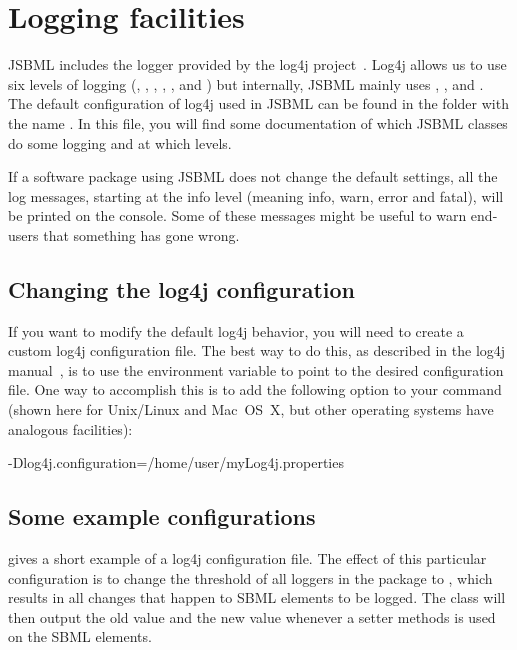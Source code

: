 \section{Logging facilities}
%

JSBML includes the logger provided by the log4j
project~\citep{log4j}.  Log4j allows us to use six levels of logging
(, , , , , and
) but internally, JSBML mainly uses , ,
and . The default configuration of log4j used in JSBML can be
found in the folder  with the name .
In this file, you will find some documentation of which JSBML classes do
some logging and at which levels.
 
If a software package using JSBML does not change the default settings, all
the log messages, starting at the info level (meaning info, warn, error and
fatal), will be printed on the console.  Some of these messages might be
useful to warn end-users that something has gone wrong.


\subsection{Changing the log4j configuration}

If you want to modify the default log4j behavior, you will need to create a
custom log4j configuration file. The best way to do this, as described in
the log4j manual~\citep{log4j}, is to use the environment variable
 to point to the desired configuration file. One
way to accomplish this is to add the following option to your 
command (shown here for Unix/Linux and Mac~OS~X, but other operating
systems have analogous facilities):

\begin{example}[style=bash, title={Command line option making log4j
    use a different configuration file.  This syntax applies to Unix-like
    systems.}] 
-Dlog4j.configuration=/home/user/myLog4j.properties
\end{example}


\subsection{Some example configurations}
%

 gives a short example of a log4j
configuration file.  The effect of this particular configuration is to
change the threshold of all loggers in the 
package to , which results in all changes that happen to SBML
elements to be logged. The class \SimpleTreeNodeChangeListener{}  will then
output the old value and the new value whenever a setter methods is used on
the SBML elements.

